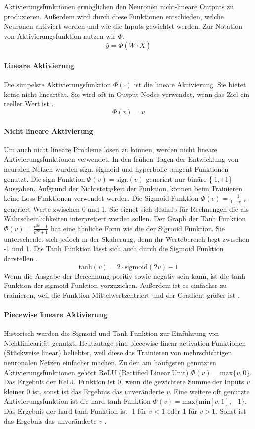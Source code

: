 Aktivierungsfunktionen ermöglichen den Neuronen nicht-lineare Outputs zu produzieren. Außerdem wird durch diese Funktionen entschieden, 
welche Neuronen aktiviert werden und wie die Inputs gewichtet werden. Zur Notation von Aktivierungsfunktion nutzen wir $\Phi$.
$$\hat{y} = \Phi(\overline{W} \cdot \overline{X})$$
\paragraph{Lineare Aktivierung}
Die simpelste Aktivierungsfunktion $\Phi(\cdot)$ ist die lineare Aktivierung. Sie bietet keine nicht linearität. Sie wird oft in Output Nodes
verwendet, wenn das Ziel ein reeller Wert ist \cite{CA18}.
$$\Phi(v) = v$$
\paragraph{Nicht lineare Aktivierung}
Um auch nicht lineare Probleme lösen zu können, werden nicht lineare Aktivierungsfunktionen verwendet. In den frühen Tagen der Entwicklung von neuralen Netzen wurden sign, sigmoid und hyperbolic tangent Funktionen genutzt.
Die sign Funktion $\Phi(v) = \text{sign}(v)$ generiert nur binäre \{-1,+1\} Ausgaben. Aufgrund der Nichtstetigkeit der Funktion, können beim Trainieren keine Loss-Funktionen verwendet werden.
Die Sigmoid Funktion $\Phi(v) = \frac{1}{1 + e^{-v}}$ generiert Werte zwischen 0 und 1. Sie eignet sich deshalb für Rechnungen die als Wahrscheinlichkeiten interpretiert werden sollen.
Der Graph der Tanh Funktion $\Phi(v) = \frac{e^{2v} - 1}{e^{2v} + 1}$ hat eine ähnliche Form wie die der Sigmoid Funktion. Sie unterscheidet sich jedoch in der Skalierung, denn ihr Wertebereich liegt zwischen -1 und 1.
Die Tanh Funktion lässt sich auch durch die Sigmoid Funktion darstellen \cite{CA18}.
$$\text{tanh}(v) = 2 \cdot \text{sigmoid}(2v) - 1$$
Wenn die Ausgabe der Berechnung positiv sowie negativ sein kann, ist die tanh Funktion der sigmoid Funktion vorzuziehen. Außerdem ist es einfacher zu trainieren, weil die Funktion Mittelwertzentriert
und der Gradient größer ist \cite{CA18}.

\paragraph{Piecewise lineare Aktivierung}
Historisch wurden die Sigmoid und Tanh Funktion zur Einführung von Nichtliniearität genutzt. Heutzutage sind piecewise linear activation Funktionen (Stückweise linear) beliebter, weil diese das Trainieren 
von mehrschichtigen neuronalen Netzen einfacher machen.
Zu den am häufigsten genutzten Aktivierungsfunktionen gehört ReLU (Rectified Linear Unit) $\Phi(v) = \text{max}\{v,0\}$. Das Ergebnis der ReLU Funktion ist 0, wenn die gewichtete Summe der Inputs $v$ kleiner 0 ist, sonst ist das Ergebnis das unveränderte $v$.
Eine weitere oft genutzte Aktivierungsfunktion ist die hard tanh Funktion $\Phi(v) = \text{max}\{\text{min}[v,1],-1\}$. Das Ergebnis der hard tanh Funktion ist -1 für $v < 1$ oder 1 für $v > 1$. Sonst ist das Ergebnis das unveränderte $v$ \cite{CA18}. 

